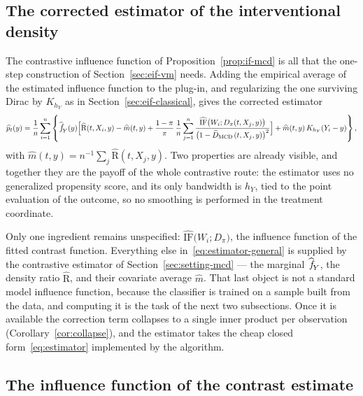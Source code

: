 \documentclass[11pt]{article}
\theoremstyle{plain}
\theoremstyle{definition}
\theoremstyle{remark}
\newcommand{\mcd}{\text{MCD}\,}
\newcommand{\pfhat}[1]{\ensuremath{\,\mathlarger{\widehat{\textit{f}}}_{#1}}}
\newcommand{\ratio}{\ensuremath{\pi}}
\newcommand{\contrast}{D_{\ratio}}
\newcommand{\contrasthat}{\widehat{D}_{\mcd}}
\newcommand{\DensityRatio}{\text{R}}
\newcommand{\IF}{\mathrm{IF}}
\begin{document}
\subsection{The corrected estimator of the interventional density}
\label{sec:mcd-estimator-form}

The contrastive influence function of Proposition~\ref{prop:if-mcd} is all that the one-step
construction of Section~\ref{sec:eif-vm} needs. Adding the empirical average of the estimated
influence function to the plug-in, and regularizing the one surviving Dirac by $K_{h_Y}$ as in
Section~\ref{sec:eif-classical}, gives the corrected estimator
\begin{equation}
\widehat p_t(y)
= \frac{1}{n}\sum_{i=1}^{n} \left\{
\pfhat{Y}(y)\Big[
\widehat{\DensityRatio}(t,X_i,y) - \widehat m(t,y)
+ \frac{1-\ratio}{\ratio}\,\frac{1}{n}\sum_{j=1}^{n}
\frac{\widehat{\IF}\big(W_i;\contrast(t,X_j,y)\big)}{\big(1-\contrasthat(t,X_j,y)\big)^{2}}
\Big]
+ \widehat m(t,y)\, K_{h_Y}(Y_i - y)
\right\},
\label{eq:estimator-general}
\end{equation}
with $\widehat m(t,y) = n^{-1}\sum_{j} \widehat{\DensityRatio}(t,X_j,y)$. Two properties are
already visible, and together they are the payoff of the whole contrastive route: the estimator
uses no generalized propensity score, and its only bandwidth is $h_Y$, tied to the point
evaluation of the outcome, so no smoothing is performed in the treatment coordinate.

Only one ingredient remains unspecified: $\widehat{\IF}\big(W_i;\contrast\big)$, the influence
function of the fitted contrast function. Everything else in~\eqref{eq:estimator-general} is
supplied by the contrastive estimator of Section~\ref{sec:setting-mcd} --- the marginal
$\pfhat{Y}$, the density ratio $\widehat{\DensityRatio}$, and their covariate average
$\widehat m$. That last object is not a standard model influence function, because the classifier
is trained on a sample built from the data, and computing it is the task of the next two
subsections. Once it is available the correction term collapses to a single inner product per
observation (Corollary~\ref{cor:collapse}), and the estimator takes the cheap closed
form~\eqref{eq:estimator} implemented by the algorithm.

\subsection{The influence function of the contrast estimate}
\label{sec:mcd-if-classifier}
\end{document}
